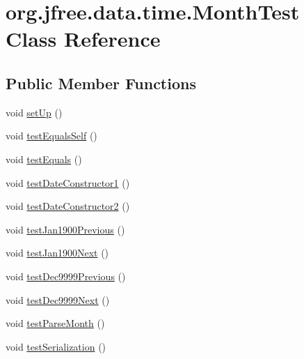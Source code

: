 \hypertarget{classorg_1_1jfree_1_1data_1_1time_1_1_month_test}{}\section{org.\+jfree.\+data.\+time.\+Month\+Test Class Reference}
\label{classorg_1_1jfree_1_1data_1_1time_1_1_month_test}
\subsection*{Public Member Functions}
\begin{DoxyCompactItemize}
\item 
void \mbox{\hyperlink{classorg_1_1jfree_1_1data_1_1time_1_1_month_test_a42fa1a8565ec489ba409581921b50677}{set\+Up}} ()
\item 
void \mbox{\hyperlink{classorg_1_1jfree_1_1data_1_1time_1_1_month_test_a5b0f089f6c83ae8bd27292214d9bf575}{test\+Equals\+Self}} ()
\item 
void \mbox{\hyperlink{classorg_1_1jfree_1_1data_1_1time_1_1_month_test_af812f4d0f40e4fc2d5306db989d89b38}{test\+Equals}} ()
\item 
void \mbox{\hyperlink{classorg_1_1jfree_1_1data_1_1time_1_1_month_test_add9f1f96dfcbd0e442bc7564bf7bc191}{test\+Date\+Constructor1}} ()
\item 
void \mbox{\hyperlink{classorg_1_1jfree_1_1data_1_1time_1_1_month_test_a6ef77a0472bff2fca09fa9bed2c2f21b}{test\+Date\+Constructor2}} ()
\item 
void \mbox{\hyperlink{classorg_1_1jfree_1_1data_1_1time_1_1_month_test_a4c2ac5f09892f26826f41e10f0f29ef0}{test\+Jan1900\+Previous}} ()
\item 
void \mbox{\hyperlink{classorg_1_1jfree_1_1data_1_1time_1_1_month_test_a163c97f1f90b6fb8639ae451376f8347}{test\+Jan1900\+Next}} ()
\item 
void \mbox{\hyperlink{classorg_1_1jfree_1_1data_1_1time_1_1_month_test_a6ff993007f6f0b8803c7ff0001ddc804}{test\+Dec9999\+Previous}} ()
\item 
void \mbox{\hyperlink{classorg_1_1jfree_1_1data_1_1time_1_1_month_test_a2ddead6dca50c393063102cdc289839f}{test\+Dec9999\+Next}} ()
\item 
void \mbox{\hyperlink{classorg_1_1jfree_1_1data_1_1time_1_1_month_test_a33267186c1ee7a054e3e65bb1326c34a}{test\+Parse\+Month}} ()
\item 
void \mbox{\hyperlink{classorg_1_1jfree_1_1data_1_1time_1_1_month_test_ab689a669b83247accf2972e57e7a8c07}{test\+Serialization}} ()

\end{DoxyCompactItemize}
